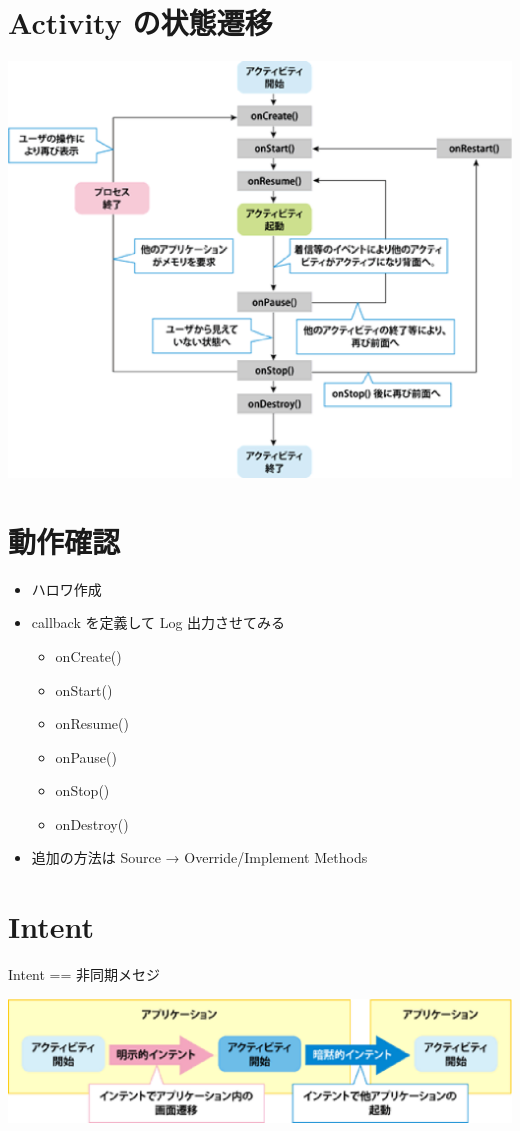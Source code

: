 \documentclass[slide,papersize]{jsarticle}
\begin{document}
\section*{Activity の状態遷移}
\medskip
\begin{center}
\includegraphics[scale=0.25]{ActivityLifecycle.eps}
\end{center}

\section*{動作確認}
\begin{itemize}
\item ハロワ作成
\item callback を定義して Log 出力させてみる
 \begin{itemize}
 \item {\footnotesize onCreate()}
 \item {\footnotesize onStart()}
 \item {\footnotesize onResume()}
 \item {\footnotesize onPause()}
 \item {\footnotesize onStop()}
 \item {\footnotesize onDestroy()}
 \end{itemize}
\item {\footnotesize 追加の方法は Source → Override/Implement Methods}
\end{itemize}

\section*{Intent}
Intent == 非同期メセジ
\medskip
\begin{center}
\includegraphics[scale=0.4]{Intent.eps}
\end{center}
\end{document}
